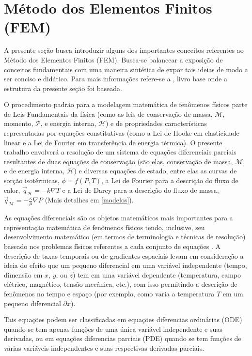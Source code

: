 \section{Método dos Elementos Finitos (FEM)}\label{fem}
A presente seção busca introduzir alguns dos importantes conceitos referentes ao Método dos Elementos Finitos (FEM). Busca-se balancear a exposição de conceitos fundamentais com uma maneira sintética de expor tais ideias de modo a ser conciso e didático. Para mais informações refere-se a \cite{langtangen2017}, livro base onde a estrutura da presente seção foi baseada.

O procedimento padrão para a modelagem matemática de fenômenos físicos parte de Leis Fundamentais da física (como as leis de conservação de massa, $\mathcal{M}$, momento, $\mathcal{P}$, e energia interna, $\mathcal{H}$) e de propriedades características representadas por equações constitutivas (como a Lei de Hooke em elasticidade linear e a Lei de Fourier em transferência de energia térmica). O presente trabalho envolverá a resolução de um sistema de equações diferenciais parciais resultantes de duas equações de conservação (são elas, conservação de massa, $\mathcal{M}$, e de energia interna, $\mathcal{H}$) e diversas equações de estado, entre elas as curvas de sorção isotérmicas, $\phi = f(P, T)$, a Lei de Fourier para a descrição do fluxo de calor, $\vec{q}_\mathcal{H} = - k \nabla T$ e a Lei de Darcy para a descrição do fluxo de massa, $\vec{q}_\mathcal{M} = -  \frac{\kappa}{\mu} \nabla P$ (Mais detalhes em \ref{modelos}).

As equações diferenciais são os objetos matemáticos mais importantes para a representação matemática de fenômenos físicos tendo, inclusive, seu desenvolvimento matemático (em termos de terminologia e técnicas de resolução)  baseado nos problemas físicos referentes a cada conjunto de equações \cite{Zauderer2006}. A descrição de taxas temporais ou de gradientes espaciais levam em consideração a ideia do efeito que um pequeno diferencial em uma variável independente (tempo, dimensão em $x$, $y$, ou $z$) tem em uma variável dependente (temperatura, campo elétrico, magnético, tensão mecânica, etc.), com isso permitindo a descrição de fenômenos no tempo e espaço (por exemplo, como varia a temperatura $T$ em um pequeno diferencial $\partial x$).

Tais equações podem ser classificadas em equações diferencias ordinárias (ODE) quando se tem apenas funções de uma única variável independente e suas derivadas, ou em equações diferencias parciais (PDE) quando se tem funções de várias variáveis independentes e suas respectivas derivadas parciais.

